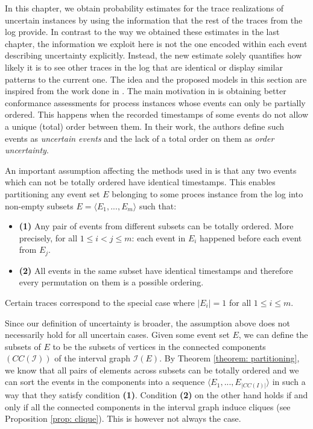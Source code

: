 In this chapter, we obtain probability estimates for the trace realizations of uncertain instances by using the information that the rest of the traces from the log provide.
In contrast to the way we obtained these estimates in the last chapter, the information we exploit here is not the one encoded within each event describing uncertainty explicitly. 
Instead, the new estimate solely quantifies how likely it is to see other traces in the log that are identical or display similar patterns to the current one.
The idea and the proposed models in this section are inspired from the work done in \cite{por}.
The main motivation in \cite{por} is obtaining better conformance assessments for process instances whose events can only be partially ordered.
This happens when the recorded timestamps of some events do not allow a unique (total) order between them.
In their work, the authors define such events as \textit{uncertain events} and the lack of a total order on them as \textit{order uncertainty}.

An important assumption affecting the methods used in \cite{por} is that any two events which can not be totally ordered have identical timestamps.
This enables partitioning any event set $E$ belonging to some proces instance from the log into non-empty subsets $E=\langle E_1,...,E_m \rangle $ such that:
\begin{itemize}
\item \textbf{(1)} Any pair of events from different subsets can be totally ordered.
More precisely, for all $1 \leq i < j \leq m$: each event in $E_i$ happened before each event from $E_j$.  
\item \textbf{(2)} All events in the same subset have identical timestamps and therefore every permutation on them is a possible ordering.
\end{itemize}
Certain traces correspond to the special case where $|E_i| = 1$ for all $1 \leq i \leq m$.

Since our definition of uncertainty is broader, the assumption above does not necessarily hold for all uncertain cases.
Given some event set $E$, we can define the subsets of $E$ to be the subsets of vertices in the connected components $(CC(\mathcal{I}))$ of the interval graph $\mathcal{I}(E)$.
By Theorem \ref{theorem: partitioning}, we know that all pairs of elements across subsets can be totally ordered and we can sort the events in the components into a sequence $\langle E_1,...,E_{|CC(I)|}\rangle$ in such a way that they satisfy condition \textbf{(1)}.
Condition \textbf{(2)} on the other hand holds if and only if all the connected components in the interval graph induce cliques (see Proposition \ref{prop: clique}).
This is however not always the case.

